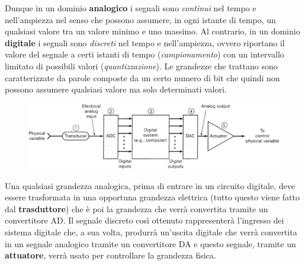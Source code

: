 \documentclass[12pt, a4paper]{report}
\begin{document}
Dunque in un dominio \textbf{analogico} i segnali sono \textit{continui} nel tempo e nell'ampiezza nel senso che possono assumere, in ogni istante di tempo, un qualsiasi valore tra un valore minimo e uno massimo. Al contrario, in un dominio \textbf{digitale} i segnali sono \textit{discreti} nel tempo e nell'ampiezza, ovvero riportano il valore del segnale a certi istanti di tempo (\textit{campionamento}) con un intervallo limitato di possibili valori (\textit{quantizzazione}). Le grandezze che trattano sono caratterizzate da parole composte da un certo numero di bit che quindi non possono assumere qualsiasi valore ma solo determinati valori.
\begin{figure}[h]
    \centering
    \includegraphics[scale=0.4,angle=0]{adda_conversione.png}
\end{figure}

Una qualsiasi grandezza analogica, prima di entrare in un circuito digitale, deve essere trasformata in una opportuna grandezza elettrica (tutto questo viene fatto dal \textbf{trasduttore}) che è poi la grandezza che verrà convertita tramite un convertitore AD. Il segnale discreto così ottenuto rappresenterà l'ingresso dei sistema digitale che, a sua volta, produrrà un'uscita digitale che verrà convertita in un segnale analogico tramite un convertitore DA e questo segnale, tramite un \textbf{attuatore}, verrà usato per controllare la grandezza fisica.
\end{document}
